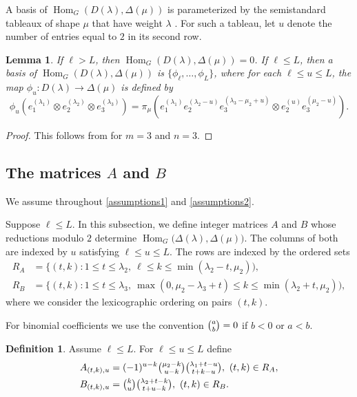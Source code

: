 \documentclass[11pt]{amsart}
\newtheorem{lemma}[theorem]{Lemma}
\theoremstyle{remark}
\theoremstyle{definition}
\newtheorem{definition}[theorem]{Definition}
\newcommand{\Hom}{\operatorname{Hom}}
\newcommand{\D}{\Delta}
\newcommand{\la}{\lambda}
\numberwithin{equation}{section}
\begin{document}
A basis of $\Hom_G(D(\la),\D(\mu))$ is parameterized by the semistandard tableaux of shape $\mu$ that have weight $\la$ \cite[Lemma 8.3.18 and Corollary 8.4.14]{Kr}.
For such a tableau, let $u$ denote the number of entries equal to $2$ in its second row.
\begin{lemma}\label{basis} If $\ell > L$, then $\Hom_G(D(\la),\D(\mu))=0$. If $\ell \le L$, then a basis of $\Hom_G(D(\la),\D(\mu))$ is $\{\phi_\ell, \dots, \phi_L\}$, where for each $\ell \le u \le L$, the map $\phi_u: D(\la) \to \D(\mu)$ is defined by \[\phi_u(e_1^{(\la_1)}\otimes e_2^{(\la_2)} \otimes e_3^{(\la_3)})=\pi_\mu(e^{(\la_1)}_1e^{(\la_2-u)}_2e^{(\la_3-\mu_2+u)}_3 \otimes e^{(u)}_2e^{(\mu_2-u)}_3).\]
\end{lemma}
\begin{proof}
	This follows from \cite[Lemma 2.3 and Remark 3.3(1)]{MS} for $m=3$ and $n=3$.
\end{proof}

\subsection{The matrices $A$ and $B$}We assume throughout \eqref{assumptions1} and \eqref{assumptions2}.

Suppose $\ell \le L$. In this subsection, we define integer matrices $A$ and $B$ whose reductions modulo $2$ determine 	$\Hom_G\bigl(\D(\la),\D(\mu)\bigr)$. The columns of both are indexed by $u$ satisfying $\ell\le u\le L$. The rows are indexed by the ordered sets
\begin{align}\label{RA}
	R_A&=\{(t,k):1\le t\le\la_2,\ \ell\le k\le\min(\la_2-t,\mu_2)),\\\label{RB}
	R_B&=\{(t,k):1\le t\le\la_3,\ \max(0,\mu_2-\la_3+t)\le k\le\min(\la_2+t,\mu_2)),
\end{align}
where we consider the lexicographic ordering on pairs $(t,k)$.

For binomial coefficients we use the convention $\tbinom{a}{b}=0$ if $b<0$ or $a<b$.

\begin{definition}\label{defAB} Assume $\ell \le L$. For $\ell\le u\le L$ define
	\begin{align*}
		A_{(t,k),u}
		&=(-1)^{u-k}\tbinom{\mu_2-k}{u-k}
		\tbinom{\la_1+t-u}{t+k-u}, \ (t,k) \in R_A,\\
		B_{(t,k),u}
		&=\tbinom{k}{u}\tbinom{\la_2+t-k}{t+u-k}, \ (t,k) \in R_B.
	\end{align*}\end{definition}
\end{document}
